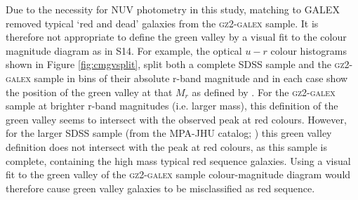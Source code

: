 Due to the necessity for NUV photometry in this study, matching to GALEX removed typical `red and dead' galaxies from the \textsc{gz2-galex} sample. It is therefore not appropriate to define the green valley by a visual fit to the  colour magnitude diagram as in S14. For example, the optical $u-r$ colour histograms shown in Figure \ref{fig:cmgvsplit}, split both a complete SDSS sample and the \textsc{gz2-galex} sample in bins of their absolute r-band magnitude and in each case show the position of the green valley at that $M_r$ as defined by \citet{Baldry04}. For the \textsc{gz2-galex} sample at brighter r-band magnitudes (i.e. larger mass), this definition of the green valley seems to intersect with the observed peak at red colours. However, for the larger SDSS sample (from the MPA-JHU catalog; \citealt{kauffmann03, brinchmann04}) this green valley definition does not intersect with the peak at red colours, as this sample is complete, containing the high mass typical red sequence galaxies. Using a visual fit to the green valley of the \textsc{gz2-galex} sample colour-magnitude diagram would therefore cause green valley galaxies to be misclassified as red sequence.


